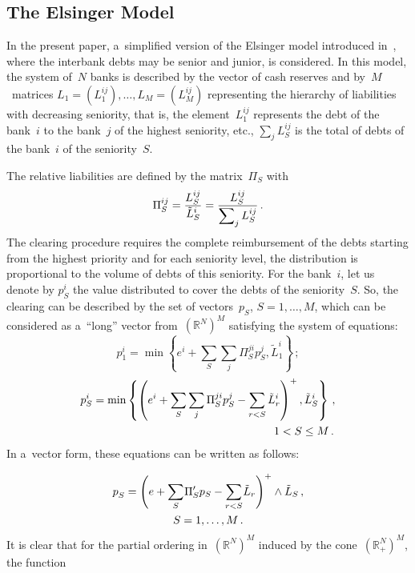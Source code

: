 \begin{multicols}{2}
\section{The Elsinger Model}

\noindent
In the present paper,  a~simplified version of the Elsinger model
introduced in~\cite{Elsinger2011}, where the interbank debts may be 
senior and junior, is considered. In this model, the system of~$N$ banks is described by the 
vector
of cash reserves and by~$M$~matrices $L_1=(L^{ij}_1), \ldots, L_M=(L^{ij}_M)$ 
representing the hierarchy of liabilities with decreasing seniority,  that is, 
the element~$L^{ij}_1$ represents the debt of the bank~$i$ to the bank~$j$ of the 
highest seniority, etc.,  $\sum_jL^{ij}_S$ is the total of  debts of the bank~$i$ 
of the seniority~$S$.

The relative liabilities are defined by  the matrix~$\Pi_S$ with
$$
\Pi_S^{ij}=\displaystyle\frac{\displaystyle L_S^{ij}\mathstrut}{\displaystyle \tilde L_S^i\mathstrut}=\displaystyle\frac{\displaystyle L_S^{ij}\mathstrut}{\displaystyle \sum\nolimits_j L_S^{ij}\mathstrut}\,.
$$
The clearing procedure requires the complete reimbursement of the debts starting 
from the highest priority and for each seniority level, the distribution is 
proportional
to the volume of debts of this seniority. For the bank~$i$, let us denote  by $p^i_S$ 
the value distributed to cover the debts of the seniority~$S$. So, the clearing 
can be described by the set of vectors~$p_S$, $S=1,\ldots, M$, which can be 
considered as a~``long'' vector from~$(\mathbb{R}^N)^M$  satisfying the system of 
equations:
\begin{equation*}
p_{1}^{i}=\min \left\{e^i+\sum\limits_S \sum\limits_j\Pi_S^{ji}p_{S}^{j}, \tilde L_1^i 
\right\}\,;
\end{equation*}
\begin{align*}
p_{S}^{i}&=\min\left\{\left(e^i+\sum\limits_S \sum\limits_j\Pi_S^{ji}p_{S}^{j}-
\sum\limits_{r<S}\tilde 
L_r^i\right)^+, \tilde L_S^i \right\}\,,  \\
&\hspace*{57mm}1<S\le M\,.
\end{align*}
In a~vector form, these equations can be written as follows:

\vspace*{-4pt}

\noindent
\begin{multline}
\label{SM}
p_{S}^{}=\left(e+\sum\limits_S \hspace*{-1.2pt}
\Pi_S'p_{S}-\sum\limits_{r<S}\hspace*{-1.2pt}\tilde L_r\right)^+\wedge  
\tilde  L_S\,,  \\ S=1,\ldots,M\,.
\end{multline}
It is clear that for the partial ordering in~$(\mathbb{R}^N)^M$ induced by the 
cone~$(\mathbb{R}^N_+)^M$, the function


\end{multicols}
